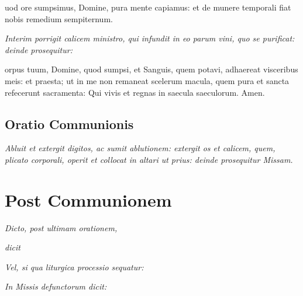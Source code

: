 uod ore sumpsimus, Domine, pura mente capiamus: et de munere
temporali fiat nobis remedium sempiternum.

\textit{%
    Interim porrigit calicem ministro, qui infundit in eo parum vini, quo se
    purificat: deinde prosequitur:
}

orpus tuum, Domine, quod sumpsi, et Sanguis, quem potavi, adhaereat
visceribus meis: et praesta; ut in me non remaneat scelerum macula, quem pura et
sancta refecerunt sacramenta: Qui vivis et regnas in saecula saeculorum.  Amen.

\subsection{Oratio Communionis}

\textit{%
    Abluit et extergit digitos, ac sumit ablutionem: extergit os et calicem,
    quem, plicato corporali, operit et collocat in altari ut prius: deinde
    prosequitur Missam.
}



\section{Post Communionem}



\textit{Dicto, post ultimam orationem,}


\textit{dicit}


\divisio

\textit{Vel, si qua liturgica processio sequatur:}


\divisio


\divisio

\textit{In Missis defunctorum dicit:}


